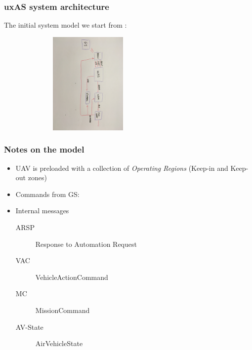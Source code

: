 \documentclass{beamer}
\begin{document}
\begin{frame}\frametitle{uxAS system architecture}

The initial system model we start from :

  \includegraphics[width=90mm,height=50mm]{uxas-orig.jpg}


\end{frame}

\begin{frame}\frametitle{Notes on the model}

\begin{itemize}
\item UAV is preloaded with a collection of \emph{Operating Regions}
  (Keep-in and Keep-out zones)
\item Commands from GS:

\item Internal messages
\begin{description}
  \item [ARSP]  Response to Automation Request
  \item [VAC]  VehicleActionCommand
  \item [MC]  MissionCommand
  \item [AV-State] AirVehicleState
\end{description}

\end{itemize}

\end{frame}
\end{document}
